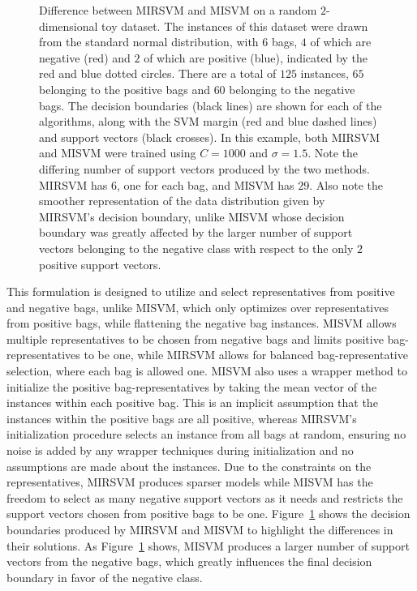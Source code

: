 \begin{figure}
\begin{minipage}{0.5\textwidth}
    \end{minipage}
    \caption{Difference between MIRSVM and MISVM on a random $2$-dimensional toy dataset. The instances of this dataset were drawn from the standard normal distribution, with $6$ bags, $4$ of which are negative (red) and $2$ of which are positive (blue), indicated by the red and blue dotted circles. There are a total of $125$ instances, $65$ belonging to the positive bags and $60$ belonging to the negative bags. The decision boundaries (black lines) are shown for each of the algorithms, along with the SVM margin (red and blue dashed lines) and support vectors (black crosses). In this example, both MIRSVM and MISVM were trained using $C = 1000$ and $\sigma = 1.5$. Note the differing number of support vectors produced by the two methods. MIRSVM has $6$, one for each bag, and MISVM has $29$. Also note the smoother representation of the data distribution given by MIRSVM's decision boundary, unlike MISVM whose decision boundary was greatly affected by the larger number of support vectors belonging to the negative class with respect to the only $2$ positive support vectors. }\label{fig:diff}
\end{figure}

This formulation is designed to utilize and select representatives from positive and negative bags, unlike MISVM, which only optimizes over representatives from positive bags, while flattening the negative bag instances. MISVM allows multiple representatives to be chosen from negative bags and limits positive bag-representatives to be one, while MIRSVM allows for balanced bag-representative selection, where each bag is allowed one. MISVM also uses a wrapper method to initialize the positive bag-representatives by taking the mean vector of the instances within each positive bag. This is an implicit assumption that the instances within the positive bags are all positive, whereas MIRSVM's initialization procedure selects an instance from all bags at random, ensuring no noise is added by any wrapper techniques during initialization and no assumptions are made about the instances. Due to the constraints on the representatives, MIRSVM produces sparser models while MISVM has the freedom to select as many negative support vectors as it needs and restricts the support vectors chosen from positive bags to be one. Figure~\ref{fig:diff} shows the decision boundaries produced by MIRSVM and MISVM to highlight the differences in their solutions. As Figure~\ref{fig:diff} shows, MISVM produces a larger number of support vectors from the negative bags, which greatly influences the final decision boundary in favor of the negative class.


